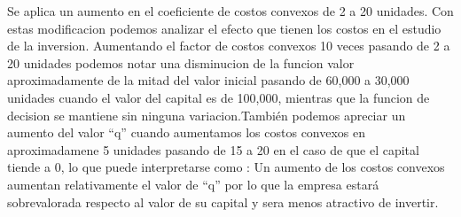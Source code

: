 \documentclass[
]{book}
\begin{document}
Se aplica un aumento en el coeficiente de costos convexos de 2 a 20
unidades. Con estas modificacion podemos analizar el efecto que tienen
los costos en el estudio de la inversion. Aumentando el factor de costos
convexos 10 veces pasando de 2 a 20 unidades podemos notar una
disminucion de la funcion valor aproximadamente de la mitad del valor
inicial pasando de 60,000 a 30,000 unidades cuando el valor del capital
es de 100,000, mientras que la funcion de decision se mantiene sin
ninguna variacion.También podemos apreciar un aumento del valor ``q''
cuando aumentamos los costos convexos en aproximadamene 5 unidades
pasando de 15 a 20 en el caso de que el capital tiende a 0, lo que puede
interpretarse como : Un aumento de los costos convexos aumentan
relativamente el valor de ``q'' por lo que la empresa estará
sobrevalorada respecto al valor de su capital y sera menos atractivo de
invertir.

\backmatter
\end{document}
